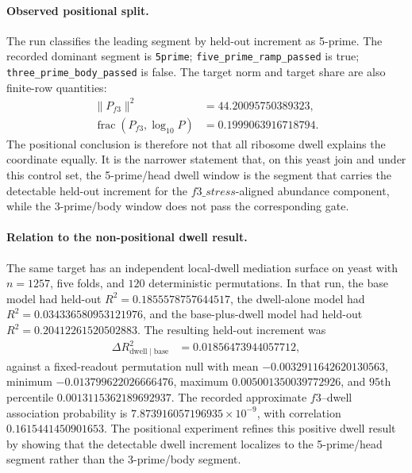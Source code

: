 \paragraph{Observed positional split.}
The run classifies the leading segment by held-out increment as 5-prime.  The recorded dominant segment is \texttt{5prime}; \texttt{five\_prime\_ramp\_passed} is true; \texttt{three\_prime\_body\_passed} is false.  The target norm and target share are also finite-row quantities:
$$
\begin{aligned}
\|P_{f3}\|^2 &= 44.20095750389323,\\
\operatorname{frac}(P_{f3},\log_{10} P) &= 0.1999063916718794.
\end{aligned}
$$
The positional conclusion is therefore not that all ribosome dwell explains the coordinate equally.  It is the narrower statement that, on this yeast join and under this control set, the 5-prime/head dwell window is the segment that carries the detectable held-out increment for the $f3\_stress$-aligned abundance component, while the 3-prime/body window does not pass the corresponding gate.

\paragraph{Relation to the non-positional dwell result.}
The same target has an independent local-dwell mediation surface on yeast with $n=1257$, five folds, and $120$ deterministic permutations.  In that run, the base model had held-out $R^2=0.1855578757644517$, the dwell-alone model had $R^2=0.034336580953121976$, and the base-plus-dwell model had held-out $R^2=0.20412261520502883$.  The resulting held-out increment was
$$
\begin{aligned}
\Delta R^2_{\mathrm{dwell}\mid\mathrm{base}} &= 0.01856473944057712,
\end{aligned}
$$
against a fixed-readout permutation null with mean $-0.0032911642620130563$, minimum $-0.013799622026666476$, maximum $0.005001350039772926$, and $95$th percentile $0.0013115362189692937$.  The recorded approximate $f3$--dwell association probability is $7.873916057196935\times 10^{-9}$, with correlation $0.1615441450901653$.  The positional experiment refines this positive dwell result by showing that the detectable dwell increment localizes to the 5-prime/head segment rather than the 3-prime/body segment.

